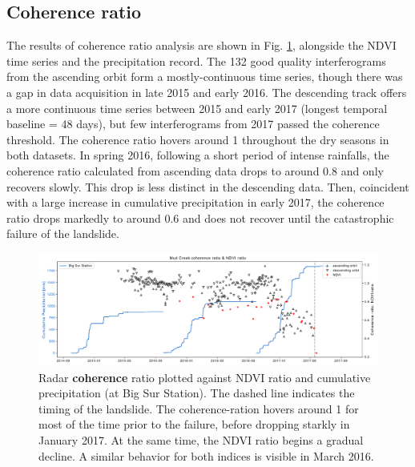 \documentclass[nhess, manuscript]{copernicus}
\begin{document}
\subsection{Coherence ratio}
The results of coherence ratio analysis are shown in Fig. \ref{fig:coherence_timeseries}, alongside the NDVI time series and the precipitation record. The 132 good quality interferograms from the ascending orbit form a mostly-continuous time series, though there was a gap in data acquisition in late 2015 and early 2016. The descending track offers a more continuous time series between 2015 and early 2017 (longest temporal baseline = 48 days), but few interferograms from 2017 passed the coherence threshold. The coherence ratio hovers around 1 throughout the dry seasons in both datasets. In spring 2016, following a short period of intense rainfalls, the coherence ratio calculated from ascending data drops to around 0.8 and only recovers slowly. This drop is less distinct in the descending data. Then, coincident with a large increase in cumulative precipitation in early 2017, the coherence ratio drops markedly to around 0.6 and does not recover until the catastrophic failure of the landslide.  \par

\begin{figure}[hbt!]
    \centering
    \includegraphics[width = \textwidth]{coherence_ndvi_2.pdf}
    \caption{Radar \textbf{coherence} ratio plotted against NDVI ratio and cumulative precipitation (at Big Sur Station). The dashed line indicates the timing of the landslide. The coherence-ration hovers around 1 for most of the time prior to the failure, before dropping starkly in January 2017. At the same time, the NDVI ratio begins a gradual decline. A similar behavior for both indices is visible in March 2016.}
    \label{fig:coherence_timeseries}
\end{figure}
\end{document}
